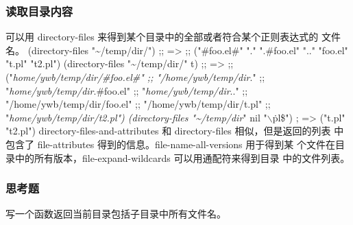 \documentclass[11pt]{ctexart}
\begin{document}
{{{{\subsubsection{读取目录内容}
\label{sec:org56d0a73}
可以用 directory-files 来得到某个目录中的全部或者符合某个正则表达式的 文件名。
(directory-files "\textasciitilde{}/temp/dir/")
;; =>
;; ("\#foo.el\#" "." ".\#foo.el" ".." "foo.el" "t.pl" "t2.pl")
(directory-files "\textasciitilde{}/temp/dir/" t)
;; =>
;; ("\emph{home/ywb/temp/dir/\#foo.el\#"
;;  "/home/ywb/temp/dir}."
;;  "\emph{home/ywb/temp/dir}.\#foo.el"
;;  "\emph{home/ywb/temp/dir}.."
;;  "/home/ywb/temp/dir/foo.el"
;;  "/home/ywb/temp/dir/t.pl"
;;  "\emph{home/ywb/temp/dir/t2.pl")
(directory-files "\textasciitilde{}/temp/dir}" nil "$\backslash$\.pl\$") ; => ("t.pl" "t2.pl")
directory-files-and-attributes 和 directory-files 相似，但是返回的列表 中包含了 file-attributes 得到的信息。file-name-all-versions 用于得到某 个文件在目录中的所有版本，file-expand-wildcards 可以用通配符来得到目录 中的文件列表。
\subsubsection{思考题}
\label{sec:org3f018e6}
写一个函数返回当前目录包括子目录中所有文件名。
}}}}
\end{document}
